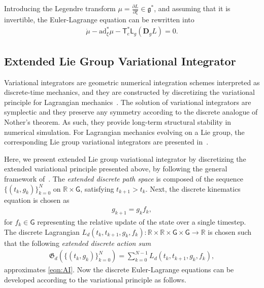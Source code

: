 \documentclass[letterpaper, 10pt, conference]{ieeeconf}
\newcommand{\deriv}[2]{\ensuremath{\frac{\partial #1}{\partial #2}}}
\newcommand{\G}{\ensuremath{\mathsf{G}}}
\newcommand{\T}{\ensuremath{\mathsf{T}}}
\renewcommand{\L}{\ensuremath{\mathsf{L}}}
\renewcommand{\Re}{\ensuremath{\mathbb{R}}}
\newcommand{\D}{\ensuremath{\mathbf{D}}}
\newcommand{\ad}{\ensuremath{\mathrm{ad}}}
\newcommand{\g}{\ensuremath{\mathfrak{g}}}
\begin{document}
Introducing the Legendre transform $\mu = \deriv{L}{\xi} \in\g^*$, and assuming that it is invertible, the Euler-Lagrange equation can be rewritten into
\begin{align}
    \dot \mu - \ad^*_{\xi} \mu - \T^*_e \L_g (\D_g L) = 0. \label{eqn:HE}
\end{align}

\subsection{Extended Lie Group Variational Integrator}

Variational integrators are geometric numerical integration schemes interpreted as discrete-time mechanics, and they are constructed by discretizing the variational principle for Lagrangian mechanics~\cite{MarWesAN01}.
The solution of variational integrators are symplectic and they preserve any symmetry according to the discrete analogue of Nother's theorem.
As such, they provide long-term structural stability in numerical simulation. 
For Lagrangian mechanics evolving on a Lie group, the corresponding Lie group variational integrators are presented in~\cite{Leo04,Lee08,LeeLeoCMAME07}.

Here, we present extended Lie group variational integrator by discretizing the extended variational principle presented above, by following the general framework of~\cite{MarWesAN01}.
The \textit{extended discrete path space} is composed of the sequence $\{(t_k, g_k)\}_{k=0}^N$ on $\Re\times\G$, satisfying $t_{k+1}>t_k$.
Next, the discrete kinematics equation is chosen as
\begin{align}
    g_{k+1} = g_k f_k, \label{eqn:gkp}
\end{align}
for $f_k \in\G$ representing the relative update of the state over a single timestep. 
The discrete Lagrangian $L_d(t_k, t_{k+1}, g_k, f_k): \Re\times\Re\times\G\times\G\rightarrow \Re$ is chosen such that the following \textit{extended discrete action sum}
\begin{align}
    \mathfrak{G}_d(\{(t_k, g_k)\}_{k=0}^N) = \sum_{k=0}^{N-1} L_d(t_k, t_{k+1}, g_k, f_k), \label{eqn:Gd}
\end{align}
approximates \eqref{eqn:AI}. 
Now the discrete Euler-Lagrange equations can be developed according to the variational principle as follows.
\end{document}
